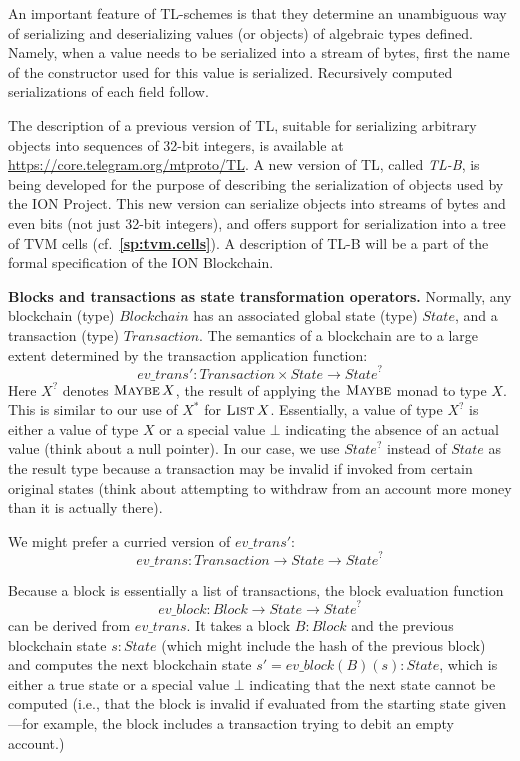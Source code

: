 \documentclass[12pt,oneside]{article}
\def\makepoint#1{\medbreak\noindent{\bf #1.\ }}
\def\nxsubpoint{\refstepcounter{subsubsection}%
  \smallbreak\makepoint{\thesubsubsection}}
\def\refpoint#1{{\rm\textbf{\ref{#1}}}}
\let\ptref=\refpoint
\def\embt(#1.){\textbf{#1.}}
\let\tp=\textit
\let\vr=\textit
\def\opsc#1{\operatorname{\textsc{#1}}}
\def\Transaction{\tp{Transaction}}
\def\State{\tp{State}}
\def\Maybe{\opsc{Maybe}}
\def\List{\opsc{List}}
\def\Block{\tp{Block}}
\def\Blockchain{\tp{Blockchain}}
\def\evtrans{\vr{ev\_trans}}
\def\evblock{\vr{ev\_block}}
\begin{document}
An important feature of TL-schemes is that they determine an
unambiguous way of serializing and deserializing values (or objects)
of algebraic types defined. Namely, when a value needs to be
serialized into a stream of bytes, first the name of the constructor
used for this value is serialized. Recursively computed serializations
of each field follow.

The description of a previous version of TL, suitable for serializing
arbitrary objects into sequences of 32-bit integers, is available at
\url{https://core.telegram.org/mtproto/TL}. A new version of TL,
called {\em TL-B}, is being developed for the purpose of describing
the serialization of objects used by the ION Project. This new version
can serialize objects into streams of bytes and even bits (not just
32-bit integers), and offers support for serialization into a tree of
TVM cells (cf.~\ptref{sp:tvm.cells}). A description of TL-B will be a
part of the formal specification of the ION Blockchain.

\nxsubpoint\label{sp:blk.transf} \embt(Blocks and transactions as
state transformation operators.)  Normally, any blockchain (type)
$\Blockchain$ has an associated global state (type) $\State$, and a
transaction (type) $\Transaction$. The semantics of a blockchain are
to a large extent determined by the transaction application function:
\begin{equation}
  \evtrans':\Transaction\times\State\to\State^?
\end{equation}
Here $X^?$ denotes $\Maybe X$, the result of applying the $\Maybe$
monad to type $X$. This is similar to our use of $X^*$ for $\List
X$. Essentially, a value of type $X^?$ is either a value of type $X$
or a special value $\bot$ indicating the absence of an actual value
(think about a null pointer). In our case, we use $\State^?$ instead
of $\State$ as the result type because a transaction may be invalid if
invoked from certain original states (think about attempting to
withdraw from an account more money than it is actually there).

We might prefer a curried version of $\evtrans'$:
\begin{equation}
  \evtrans:\Transaction\to\State\to\State^?
\end{equation}

Because a block is essentially a list of transactions, the block
evaluation function
\begin{equation}
  \evblock:\Block\to\State\to\State^?
\end{equation}
can be derived from $\evtrans$. It takes a block $B:\Block$ and the
previous blockchain state $s:\State$ (which might include the hash of
the previous block) and computes the next blockchain state
$s'=\evblock(B)(s):\State$, which is either a true state or a special
value $\bot$ indicating that the next state cannot be computed (i.e.,
that the block is invalid if evaluated from the starting state
given---for example, the block includes a transaction trying to debit
an empty account.)
\end{document}
